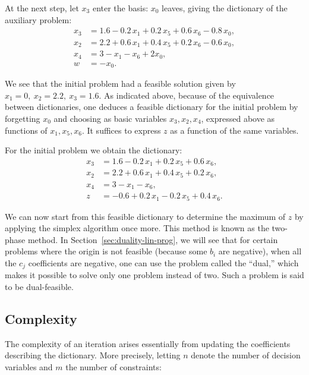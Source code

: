 At the next step, let \(x_3\) enter the basis: \(x_0\) leaves, giving the dictionary of the auxiliary problem:
\[
    \begin{aligned}
    x_3 &= 1.6 - 0.2\,x_1 + 0.2\,x_5 + 0.6\,x_6 - 0.8\,x_0,\\
    x_2 &= 2.2 + 0.6\,x_1 + 0.4\,x_5 + 0.2\,x_6 - 0.6\,x_0,\\
    x_4 &= 3 - x_1 - x_6 + 2x_0,\\
    \hline
    w &= -x_0.
    \end{aligned}
\]

We see that the initial problem had a feasible solution given by \(x_1 = 0,\ x_2 = 2.2,\ x_3 = 1.6\). As indicated above, because of the equivalence between dictionaries, one deduces a feasible dictionary for the initial problem by \og forgetting \fg \(x_0\) and choosing as basic variables \(x_3, x_2, x_4\), expressed above as functions of \(x_1, x_5, x_6\). It suffices to express \(z\) as a function of the same variables.

For the initial problem we obtain the dictionary:
\[
    \begin{aligned}
    x_3 &= 1.6 - 0.2\,x_1 + 0.2\,x_5 + 0.6\,x_6,\\
    x_2 &= 2.2 + 0.6\,x_1 + 0.4\,x_5 + 0.2\,x_6,\\
    x_4 &= 3 - x_1 - x_6,\\
    \hline
    z &= -0.6 + 0.2\,x_1 - 0.2\,x_5 + 0.4\,x_6.
    \end{aligned}
\]

We can now start from this feasible dictionary to determine the maximum of \(z\) by applying the simplex algorithm once more. This method is known as the two-phase method. In Section~\ref{sec:duality-lin-prog}, we will see that for certain problems where the origin is not feasible (because some \(b_i\) are negative), when all the \(c_j\) coefficients are negative, one can use the problem called the “dual,” which makes it possible to solve only one problem instead of two. Such a problem is said to be dual-feasible.

\subsection{Complexity}

The complexity of an iteration arises essentially from updating the coefficients describing the dictionary. More precisely, letting \(n\) denote the number of decision variables and \(m\) the number of constraints:

